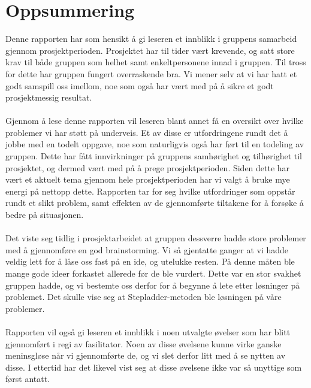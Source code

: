 \section*{\centering Oppsummering}
Denne rapporten har som hensikt å gi leseren et innblikk i gruppens samarbeid gjennom prosjektperioden. Prosjektet har til tider vært krevende, og satt store krav til både gruppen som helhet samt enkeltpersonene innad i gruppen. Til tross for dette har gruppen fungert overraskende bra. Vi mener selv at vi har hatt et godt samspill oss imellom, noe som også har vært med på å sikre et godt prosjektmessig resultat.\\\\
Gjennom å lese denne rapporten vil leseren blant annet få en oversikt over hvilke problemer vi har støtt på underveis. Et av disse er utfordringene rundt det å jobbe med en todelt oppgave, noe som naturligvis også har ført til en todeling av gruppen. Dette har fått innvirkninger på gruppens samhørighet og tilhørighet til prosjektet, og dermed vært med på å prege prosjektperioden. Siden dette har vært et aktuelt tema gjennom hele prosjektperioden har vi valgt å bruke mye energi på nettopp dette. Rapporten tar for seg hvilke utfordringer som oppstår rundt et slikt problem, samt effekten av de gjennomførte tiltakene for å forsøke å bedre på situasjonen.\\\\
Det viste seg tidlig i prosjektarbeidet at gruppen dessverre hadde store problemer med å gjennomføre en god brainstorming. Vi så gjentatte ganger at vi hadde veldig lett for å låse oss fast på en ide, og utelukke resten. På denne måten ble mange gode ideer forkastet allerede før de ble vurdert. Dette var en stor svakhet gruppen hadde, og vi bestemte oss derfor for å begynne å lete etter løsninger på problemet. Det skulle vise seg at Stepladder-metoden ble løsningen på våre problemer.\\\\
Rapporten vil også gi leseren et innblikk i noen utvalgte øvelser som har blitt gjennomført i regi av fasilitator. Noen av disse øvelsene kunne virke ganske meninsgløse når vi gjennomførte de, og vi slet derfor litt med å se nytten av disse. I ettertid har det likevel vist seg at disse øvelsene ikke var så unyttige som først antatt.



